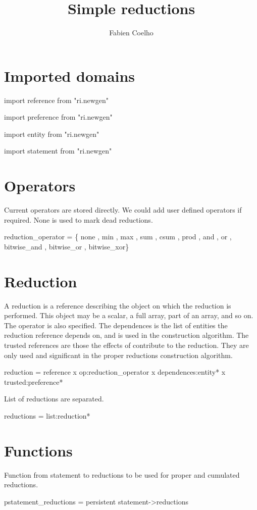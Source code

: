 \documentclass[a4paper]{article}
\title{Simple reductions}
\author{Fabien Coelho}
\newcommand{\domain}[1]{\par{#1}}
\begin{document}
\maketitle

\section{Imported domains}
\label{sec:import}

\domain{import reference from "ri.newgen"}
\domain{import preference from "ri.newgen"}
\domain{import entity from "ri.newgen"}
\domain{import statement from "ri.newgen"}

\section{Operators}
\label{sec:operators}

Current operators are stored directly.
We could add user defined operators if required.
None is used to mark dead reductions. 

\domain{reduction\_operator = \{ none , min , max , sum , csum , prod , and , or , bitwise\_and , bitwise\_or , bitwise\_xor\}}
{}

\section{Reduction}
\label{sec:reduction}

A reduction is a reference describing the object on which the reduction is
performed. This object may be a scalar, a full array, part of an array,
and so on. The operator is also specified. The dependences is the list of
entities the reduction reference depends on, and is used in the
construction algorithm. The trusted references are those the effects of
contribute to the reduction. They are only used and significant in the
proper reductions construction algorithm.

\domain{reduction = reference x op:reduction\_operator x dependences:entity* x trusted:preference*}
{}

List of reductions are separated.

\domain{reductions = list:reduction*}
{}


\section{Functions}
\label{sec:functions}

Function from statement to reductions to be used for proper and cumulated
reductions. 

\domain{pstatement\_reductions = persistent statement->reductions}
{}
\end{document}
